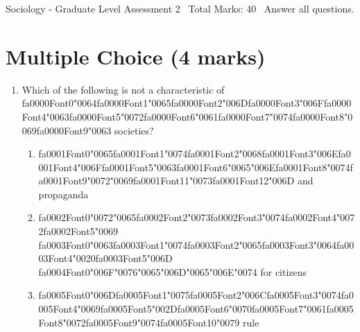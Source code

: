 \documentclass[12pt]{article}
\begin{document}
\begin{center}
Sociology - Graduate Level Assessment 2 \
Total Marks: 40 \
Answer all questions.
\end{center}

\section*{Multiple Choice (4 marks)}
\begin{enumerate}[label=\arabic*.]
\item Which of the following is not a characteristic of {\csname fa0000Font0\endcsname\char"0064}{\csname fa0000Font1\endcsname\char"0065}{\csname fa0000Font2\endcsname\char"006D}{\csname fa0000Font3\endcsname\char"006F}{\csname fa0000Font4\endcsname\char"0063}{\csname fa0000Font5\endcsname\char"0072}{\csname fa0000Font6\endcsname\char"0061}{\csname fa0000Font7\endcsname\char"0074}{\csname fa0000Font8\endcsname\char"0069}{\csname fa0000Font9\endcsname\char"0063} societies?
\begin{enumerate}[label=(\alph*)]
    \item {\csname fa0001Font0\endcsname\char"0065}{\csname fa0001Font1\endcsname\char"0074}{\csname fa0001Font2\endcsname\char"0068}{\csname fa0001Font3\endcsname\char"006E}{\csname fa0001Font4\endcsname\char"006F}{\csname fa0001Font5\endcsname\char"0063}{\csname fa0001Font6\endcsname\char"0065}{\char"006E}{\csname fa0001Font8\endcsname\char"0074}{\csname fa0001Font9\endcsname\char"0072}{\char"0069}{\csname fa0001Font11\endcsname\char"0073}{\csname fa0001Font12\endcsname\char"006D} and propaganda
    \item {\csname fa0002Font0\endcsname\char"0072}{\char"0065}{\csname fa0002Font2\endcsname\char"0073}{\csname fa0002Font3\endcsname\char"0074}{\csname fa0002Font4\endcsname\char"0072}{\csname fa0002Font5\endcsname\char"0069} {\csname fa0003Font0\endcsname\char"0063}{\csname fa0003Font1\endcsname\char"0074}{\csname fa0003Font2\endcsname\char"0065}{\csname fa0003Font3\endcsname\char"0064}{\csname fa0003Font4\endcsname\char"0020}{\csname fa0003Font5\endcsname\char"006D} {\csname fa0004Font0\endcsname\char"006F}{\char"0076}{\char"0065}{\char"006D}{\char"0065}{\char"006E}{\char"0074} for citizens
    \item {\csname fa0005Font0\endcsname\char"006D}{\csname fa0005Font1\endcsname\char"0075}{\csname fa0005Font2\endcsname\char"006C}{\csname fa0005Font3\endcsname\char"0074}{\csname fa0005Font4\endcsname\char"0069}{\csname fa0005Font5\endcsname\char"002D}{\csname fa0005Font6\endcsname\char"0070}{\csname fa0005Font7\endcsname\char"0061}{\csname fa0005Font8\endcsname\char"0072}{\csname fa0005Font9\endcsname\char"0074}{\csname fa0005Font10\endcsname\char"0079} rule

\end{enumerate}
\end{enumerate}
\end{document}
